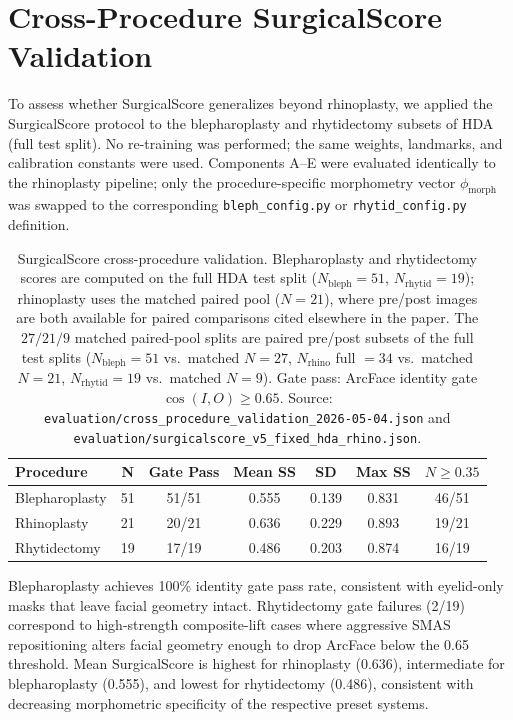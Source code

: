 \documentclass{article}
\begin{document}
\section{Cross-Procedure SurgicalScore Validation}
\label{app:cross_proc}

To assess whether SurgicalScore generalizes beyond rhinoplasty, we applied the
SurgicalScore protocol to the blepharoplasty and rhytidectomy subsets of HDA (full test split).
No re-training was performed; the same weights, landmarks, and calibration constants
were used. Components A--E were evaluated identically to the rhinoplasty pipeline;
only the procedure-specific morphometry vector $\phi_\text{morph}$ was swapped
to the corresponding \texttt{bleph\_config.py} or \texttt{rhytid\_config.py} definition.

\begin{table}[h]
\centering
\small
\caption{SurgicalScore cross-procedure validation. Blepharoplasty and rhytidectomy
scores are computed on the full HDA test split ($N_\text{bleph}{=}51$, $N_\text{rhytid}{=}19$);
rhinoplasty uses the matched paired pool ($N{=}21$), where pre/post images are
both available for paired comparisons cited elsewhere in the paper. The
$27/21/9$ matched paired-pool splits are paired pre/post subsets of the full
test splits ($N_\text{bleph}{=}51$ vs.\ matched $N{=}27$, $N_\text{rhino}$ full
$=34$ vs.\ matched $N{=}21$, $N_\text{rhytid}{=}19$ vs.\ matched $N{=}9$).
Gate pass: ArcFace identity gate $\cos(I,O)\geq 0.65$.
Source: \texttt{evaluation/cross\_procedure\_validation\_2026-05-04.json} and
\texttt{evaluation/surgicalscore\_v5\_fixed\_hda\_rhino.json}.}
\label{tab:cross_proc}
\begin{tabular}{@{}lcccccc@{}}
\toprule
\textbf{Procedure} & \textbf{N} & \textbf{Gate Pass} &
\textbf{Mean SS} & \textbf{SD} & \textbf{Max SS} &
\textbf{$N{\geq}0.35$} \\
\midrule
Blepharoplasty & 51 & 51/51 & 0.555 & 0.139 & 0.831 & 46/51 \\
Rhinoplasty    & 21 & 20/21 & 0.636 & 0.229 & 0.893 & 19/21 \\
Rhytidectomy   & 19 & 17/19 & 0.486 & 0.203 & 0.874 & 16/19 \\
\bottomrule
\end{tabular}
\end{table}

Blepharoplasty achieves 100\% identity gate pass rate, consistent with eyelid-only
masks that leave facial geometry intact. Rhytidectomy gate failures (2/19) correspond
to high-strength composite-lift cases where aggressive SMAS repositioning alters
facial geometry enough to drop ArcFace below the 0.65 threshold. Mean SurgicalScore
is highest for rhinoplasty (0.636), intermediate for blepharoplasty (0.555),
and lowest for rhytidectomy (0.486), consistent with decreasing morphometric
specificity of the respective preset systems.
\end{document}

